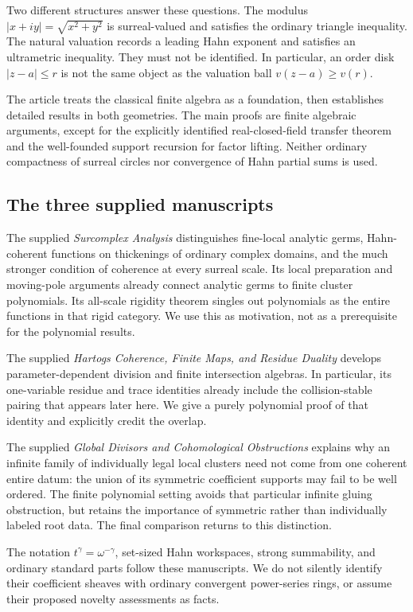 \documentclass[11pt,letterpaper]{article}
\numberwithin{equation}{section}
\theoremstyle{definition}
\theoremstyle{remark}\newtheorem{remark}[theorem]{Remark}
\begin{document}
Two different structures answer these questions. The modulus
$|x+iy|=\sqrt{x^2+y^2}$ is surreal-valued and satisfies the ordinary triangle
inequality. The natural valuation records a leading Hahn exponent and
satisfies an ultrametric inequality. They must not be identified. In
particular, an order disk $|z-a|\le r$ is not the same object as the valuation
ball $v(z-a)\ge v(r)$.

The article treats the classical finite algebra as a foundation, then
establishes detailed results in both geometries. The main proofs are finite
algebraic arguments, except for the explicitly identified real-closed-field
transfer theorem and the well-founded support recursion for factor lifting.
Neither ordinary compactness of surreal circles nor convergence of Hahn
partial sums is used.

\subsection{The three supplied manuscripts}
The supplied \emph{Surcomplex Analysis} \cite{SourceAnalysis} distinguishes
fine-local analytic germs, Hahn-coherent functions on thickenings of ordinary
complex domains, and the much stronger condition of coherence at every
surreal scale. Its local preparation and moving-pole arguments already
connect analytic germs to finite cluster polynomials. Its all-scale rigidity
theorem singles out polynomials as the entire functions in that rigid category.
We use this as motivation, not as a prerequisite for the polynomial results.

The supplied \emph{Hartogs Coherence, Finite Maps, and Residue Duality}
\cite{SourceResearch} develops parameter-dependent division and finite
intersection algebras. In particular, its one-variable residue and trace
identities already include the collision-stable pairing that appears later
here. We give a purely polynomial proof of that identity and explicitly
credit the overlap.

The supplied \emph{Global Divisors and Cohomological Obstructions}
\cite{SourceGlobal} explains why an infinite family of individually legal
local clusters need not come from one coherent entire datum: the union of
its symmetric coefficient supports may fail to be well ordered. The finite
polynomial setting avoids that particular infinite gluing obstruction, but
retains the importance of symmetric rather than individually labeled root
data. The final comparison returns to this distinction.

The notation $t^\gamma=\omega^{-\gamma}$, set-sized Hahn workspaces, strong
summability, and ordinary standard parts follow these manuscripts. We do not
silently identify their coefficient sheaves with ordinary convergent
power-series rings, or assume their proposed novelty assessments as facts.
\end{document}
